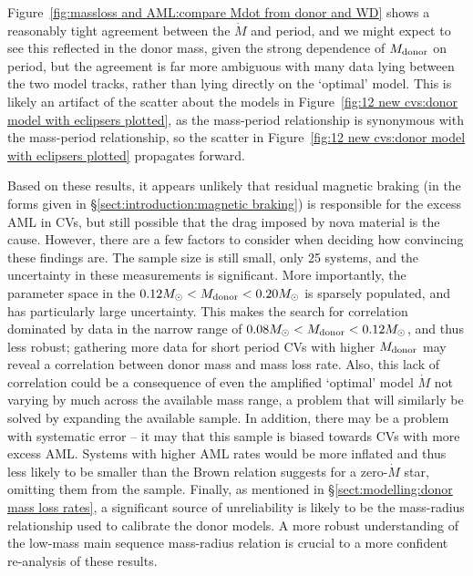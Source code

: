 Figure~\ref{fig:massloss and AML:compare Mdot from donor and WD} shows a reasonably tight agreement between the $\dot M$ and period, and we might expect to see this reflected in the donor mass, given the strong dependence of $M_{\rm donor}$ on period, but the agreement is far more ambiguous with many data lying between the two model tracks, rather than lying directly on the `optimal' model. This is likely an artifact of the scatter about the models in Figure~\ref{fig:12 new cvs:donor model with eclipsers plotted}, as the mass-period relationship is synonymous with the mass-period relationship, so the scatter in Figure~\ref{fig:12 new cvs:donor model with eclipsers plotted} propagates forward.

Based on these results, it appears unlikely that residual magnetic braking (in the forms given in \S\ref{sect:introduction:magnetic braking}) is responsible for the excess AML in CVs, but still possible that the drag imposed by nova material is the cause.
However, there are a few factors to consider when deciding how convincing these findings are.
The sample size is still small, only 25 systems, and the uncertainty in these measurements is significant.
More importantly, the parameter space in the $0.12 M_\odot < M_{\rm donor} < 0.20 M_\odot$ is sparsely populated, and has particularly large uncertainty. This makes the search for correlation dominated by data in the narrow range of $0.08 M_\odot < M_{\rm donor} < 0.12 M_\odot$, and thus less robust; gathering more data for short period CVs with higher $M_{\rm donor}$ may reveal a correlation between donor mass and mass loss rate.
Also, this lack of correlation could be a consequence of even the amplified `optimal' model $\dot M$ not varying by much across the available mass range, a problem that will similarly be solved by expanding the available sample.
In addition, there may be a problem with systematic error -- it may that this sample is biased towards CVs with more excess AML. Systems with higher AML rates would be more inflated and thus less likely to be smaller than the Brown relation suggests for a zero-$\dot M$ star, omitting them from the sample.
Finally, as mentioned in \S\ref{sect:modelling:donor mass loss rates}, a significant source of unreliability is likely to be the mass-radius relationship used to calibrate the donor models. A more robust understanding of the low-mass main sequence mass-radius relation is crucial to a more confident re-analysis of these results.


